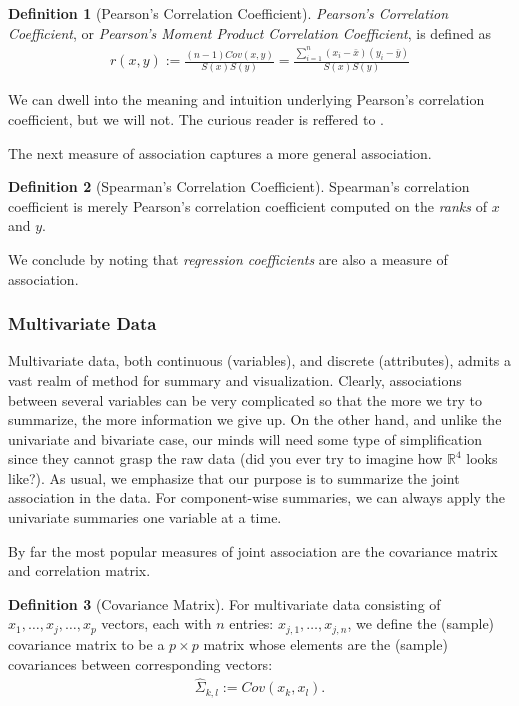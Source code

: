 \documentclass[12pt,a4paper]{report}
\theoremstyle{plain}
\theoremstyle{definition}
\newtheorem{definition}{Definition}
\begin{document}
\begin{definition}[Pearson's Correlation Coefficient]
\emph{Pearson’s Correlation Coefficient}, or \emph{Pearson's Moment Product Correlation Coefficient}, is defined as
\begin{align}
	r(x,y):= \frac{(n-1) Cov(x,y)}{S(x) S(y)}= \frac{\sum_{i=1}^{n} (x_i-\bar{x})(y_i-\bar{y})}{S(x) S(y)}
\end{align}
\end{definition}
We can dwell into the meaning and intuition underlying Pearson's correlation coefficient, but we will not. 
The curious reader is reffered to \cite{rodgers_thirteen_1988}.

The next measure of association captures a more general association.
\begin{definition}[Spearman's Correlation Coefficient]
Spearman's correlation coefficient is merely Pearson's correlation coefficient computed on the \emph{ranks} of $x$ and $y$. 
\end{definition}

We conclude by noting that \emph{regression coefficients} are also a measure of association. 





\subsubsection{Multivariate Data}
Multivariate data, both continuous (variables), and discrete (attributes), admits a vast realm of method for summary and visualization.
Clearly, associations between several variables can be very complicated so that the more we try to summarize, the more information we give up. On the other hand, and unlike the univariate and bivariate case, our minds will need some type of simplification since they cannot grasp the raw data (did you ever try to imagine how $\mathbb{R}^4$ looks like?).
As usual, we emphasize that our purpose is to summarize the joint association in the data. 
For component-wise summaries, we can always apply the univariate summaries one variable at a time. 

By far the most popular measures of joint association are the covariance matrix and correlation matrix.

\begin{definition}[Covariance Matrix]
For multivariate data consisting of $x_1,\dots,x_j,\dots,x_p$ vectors, each with $n$ entries: $x_{j,1},\dots,x_{j,n}$, we define the (sample) covariance matrix to be a $p\times p$ matrix whose elements are the (sample) covariances between corresponding vectors:
\begin{align}
	\hat{\Sigma}_{k,l}:= Cov(x_k, x_l).
\end{align}
\end{definition}
\end{document}
